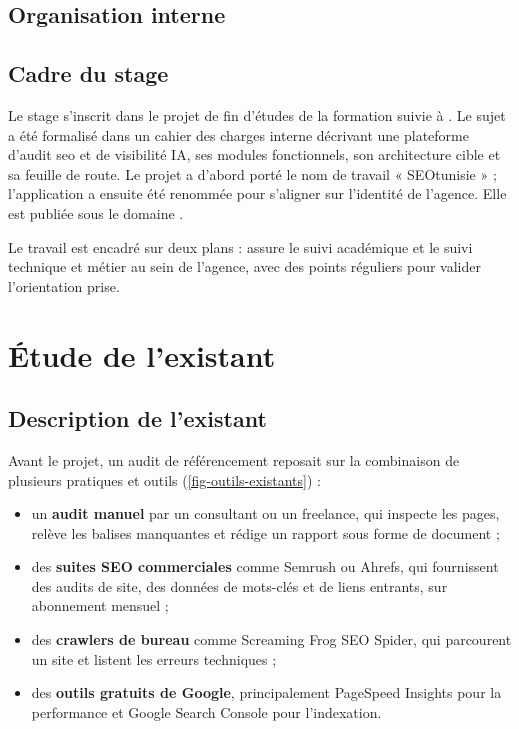 \subsection{Organisation interne}

\subsection{Cadre du stage}
Le stage s'inscrit dans le projet de fin d'études de la formation suivie à \etablissement. Le sujet a été formalisé dans un cahier des charges interne décrivant une plateforme d'audit \gls{seo} et de visibilité IA, ses modules fonctionnels, son architecture cible et sa feuille de route. Le projet a d'abord porté le nom de travail « SEOtunisie » ; l'application a ensuite été renommée \xapp{} pour s'aligner sur l'identité de l'agence. Elle est publiée sous le domaine \urlprod.

Le travail est encadré sur deux plans : \encadrantacad{} assure le suivi académique et \encadrantent{} le suivi technique et métier au sein de l'agence, avec des points réguliers pour valider l'orientation prise. 

\section{Étude de l'existant}

\subsection{Description de l'existant}
Avant le projet, un audit de référencement reposait sur la combinaison de plusieurs pratiques et outils (\cref{fig-outils-existants}) :
\begin{itemize}
  \item un \textbf{audit manuel} par un consultant ou un freelance, qui inspecte les pages, relève les balises manquantes et rédige un rapport sous forme de document ;
  \item des \textbf{suites SEO commerciales} comme Semrush ou Ahrefs, qui fournissent des audits de site, des données de mots-clés et de liens entrants, sur abonnement mensuel ;
  \item des \textbf{crawlers de bureau} comme Screaming Frog SEO Spider, qui parcourent un site et listent les erreurs techniques ;
  \item des \textbf{outils gratuits de Google}, principalement PageSpeed Insights pour la performance et Google Search Console pour l'indexation.
\end{itemize}

